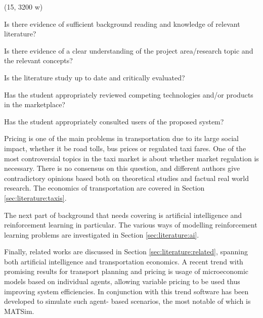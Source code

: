 (15, 3200 w)

Is there evidence of sufficient background reading and knowledge of relevant
literature?

Is there evidence of a clear understanding of the project area/research topic
and the relevant concepts?

Is the literature study up to date and critically evaluated?

Has the student appropriately reviewed competing technologies and/or products
in the marketplace?

Has the student appropriately consulted users of the proposed system?


Pricing is one of the main problems in transportation due to its large social
impact, whether it be road tolls, bus prices or regulated taxi fares. One of
the most controversial topics in the taxi market is about whether market
regulation is necessary. There is no consensus on this question, and different
authors give contradictory opinions based both on theoretical studies and
factual real world research. The economics of transportation are covered in
Section \ref{sec:literature:taxis}.

The next part of background that needs covering is artificial intelligence and
reinforcement learning in particular. The various ways of modelling
reinforcement learning problems are investigated in Section
\ref{sec:literature:ai}.

Finally, related works are discussed in Section \ref{sec:literature:related},
spanning both artificial intelligence and transportation economics. A recent
trend with promising results for transport planning and pricing is usage of
microeconomic models based on individual agents, allowing variable pricing to
be used thus improving system efficiencies. In conjunction with this trend
software has been developed to simulate such agent- based scenarios, the most
notable of which is MATSim.
